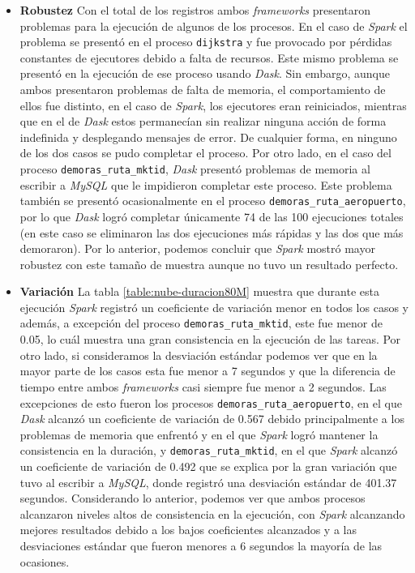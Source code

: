 \begin{itemize}
	\item \textbf{Robustez} Con el total de los registros ambos \textit{frameworks} presentaron problemas para la ejecución de algunos de los procesos. En el caso de \textit{Spark} el problema se presentó en el proceso \texttt{dijkstra} y fue provocado por pérdidas constantes de ejecutores debido a falta de recursos. Este mismo problema se presentó en la ejecución de ese proceso usando \textit{Dask}. Sin embargo, aunque ambos presentaron problemas de falta de memoria, el comportamiento de ellos fue distinto, en el caso de \textit{Spark}, los ejecutores eran reiniciados, mientras que en el de \textit{Dask} estos permanecían sin realizar ninguna acción de forma indefinida y desplegando mensajes de error. De cualquier forma, en ninguno de los dos casos se pudo completar el proceso. Por otro lado, en el caso del proceso \texttt{demoras\_ruta\_mktid}, \textit{Dask} presentó problemas de memoria al escribir a \textit{MySQL} que le impidieron completar este proceso. Este problema también se presentó ocasionalmente en el proceso \texttt{demoras\_ruta\_aeropuerto}, por lo que \textit{Dask} logró completar únicamente 74 de las 100 ejecuciones totales (en este caso se eliminaron las dos ejecuciones más rápidas y las dos que más demoraron). Por lo anterior, podemos concluir que \textit{Spark} mostró mayor robustez con este tamaño de muestra aunque no tuvo un resultado perfecto. 
	
	\item \textbf{Variación} La tabla \ref{table:nube-duracion80M} muestra que durante esta ejecución \textit{Spark} registró un coeficiente de variación menor en todos los casos y además, a excepción del proceso \texttt{demoras\_ruta\_mktid}, este fue menor de 0.05, lo cuál muestra una gran consistencia en la ejecución de las tareas. Por otro lado, si consideramos la desviación estándar podemos ver que en la mayor parte de los casos esta fue menor a 7 segundos y que la diferencia de tiempo entre ambos \textit{frameworks} casi siempre fue menor a 2 segundos. Las excepciones de esto fueron los procesos \texttt{demoras\_ruta\_aeropuerto}, en el que \textit{Dask} alcanzó un coeficiente de variación de 0.567 debido principalmente a los problemas de memoria que enfrentó y en el que \textit{Spark} logró mantener la consistencia en la duración, y \texttt{demoras\_ruta\_mktid}, en el que \textit{Spark} alcanzó un coeficiente de variación de 0.492 que se explica por la gran variación que tuvo al escribir a \textit{MySQL}, donde registró una desviación estándar de 401.37 segundos. Considerando lo anterior, podemos ver que ambos procesos alcanzaron niveles altos de consistencia en la ejecución, con \textit{Spark} alcanzando mejores resultados debido a los bajos coeficientes alcanzados y a las desviaciones estándar que fueron menores a 6 segundos la mayoría de las ocasiones.
	

\end{itemize}
